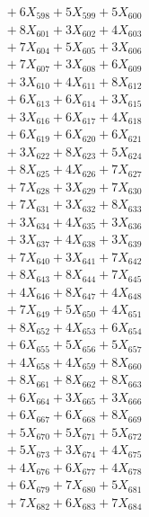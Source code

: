 \documentclass[a4paper,10pt]{article}
\begin{document}
{\begin{align}
&\;  + 6 X_{598} + 5 X_{599} + 5 X_{600} \\[0.3ex]
&\;  + 8 X_{601} + 3 X_{602} + 4 X_{603} \\[0.3ex]
&\;  + 7 X_{604} + 5 X_{605} + 3 X_{606} \\[0.3ex]
&\;  + 7 X_{607} + 3 X_{608} + 6 X_{609} \\[0.5ex]\allowbreak
&\;  + 3 X_{610} + 4 X_{611} + 8 X_{612} \\[0.3ex]
&\;  + 6 X_{613} + 6 X_{614} + 3 X_{615} \\[0.3ex]
&\;  + 3 X_{616} + 6 X_{617} + 4 X_{618} \\[0.3ex]
&\;  + 6 X_{619} + 6 X_{620} + 6 X_{621} \\[0.3ex]
&\;  + 3 X_{622} + 8 X_{623} + 5 X_{624} \\[0.3ex]
&\;  + 8 X_{625} + 4 X_{626} + 7 X_{627} \\[0.3ex]
&\;  + 7 X_{628} + 3 X_{629} + 7 X_{630} \\[0.3ex]
&\;  + 7 X_{631} + 3 X_{632} + 8 X_{633} \\[0.3ex]
&\;  + 3 X_{634} + 4 X_{635} + 3 X_{636} \\[0.3ex]
&\;  + 3 X_{637} + 4 X_{638} + 3 X_{639} \\[0.5ex]\allowbreak
&\;  + 7 X_{640} + 3 X_{641} + 7 X_{642} \\[0.3ex]
&\;  + 8 X_{643} + 8 X_{644} + 7 X_{645} \\[0.3ex]
&\;  + 4 X_{646} + 8 X_{647} + 4 X_{648} \\[0.3ex]
&\;  + 7 X_{649} + 5 X_{650} + 4 X_{651} \\[0.3ex]
&\;  + 8 X_{652} + 4 X_{653} + 6 X_{654} \\[0.3ex]
&\;  + 6 X_{655} + 5 X_{656} + 5 X_{657} \\[0.3ex]
&\;  + 4 X_{658} + 4 X_{659} + 8 X_{660} \\[0.3ex]
&\;  + 8 X_{661} + 8 X_{662} + 8 X_{663} \\[0.3ex]
&\;  + 6 X_{664} + 3 X_{665} + 3 X_{666} \\[0.3ex]
&\;  + 6 X_{667} + 6 X_{668} + 8 X_{669} \\[0.5ex]\allowbreak
&\;  + 5 X_{670} + 5 X_{671} + 5 X_{672} \\[0.3ex]
&\;  + 5 X_{673} + 3 X_{674} + 4 X_{675} \\[0.3ex]
&\;  + 4 X_{676} + 6 X_{677} + 4 X_{678} \\[0.3ex]
&\;  + 6 X_{679} + 7 X_{680} + 5 X_{681} \\[0.3ex]
&\;  + 7 X_{682} + 6 X_{683} + 7 X_{684} \\[0.3ex]

\end{align}}
\end{document}
